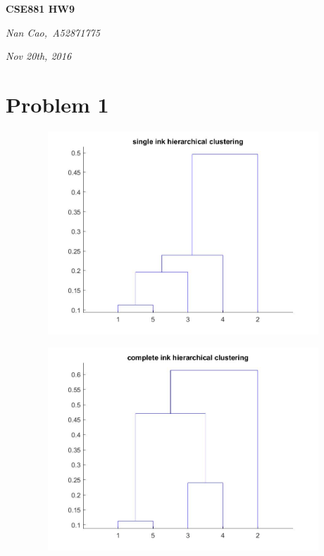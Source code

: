 \documentclass[11pt]{scrartcl}
\begin{document}
\centerline{\LARGE{\textbf{CSE881 HW9}}}
\centerline{\large{\textit{Nan Cao,\  A52871775}}}
\centerline{\large{\textit{Nov 20th, 2016}}}

\section*{Problem 1}
\begin{figure}[h]
    \includegraphics[width=4.5in,height=3in]{q1single.jpg}
\end{figure}
\begin{figure} [h]
    \includegraphics[width=4.5in,height=3in]{q1complete.jpg}
\end{figure}
\end{document}

